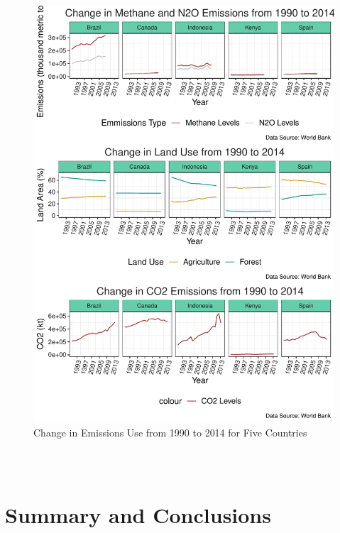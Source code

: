 \documentclass[12pt,]{article}
\begin{document}
\begin{figure}
\centering
\includegraphics{Marx_ENV872_Project_files/figure-latex/unnamed-chunk-13-1.pdf}
\caption{\label{fig:fig7}Change in Emissions Use from 1990 to 2014 for
Five Countries}
\end{figure}

\begin{verbatim}


\end{verbatim}

\begin{verbatim}

\end{verbatim}

\newpage

\section{Summary and Conclusions}\label{summary-and-conclusions}
\end{document}
